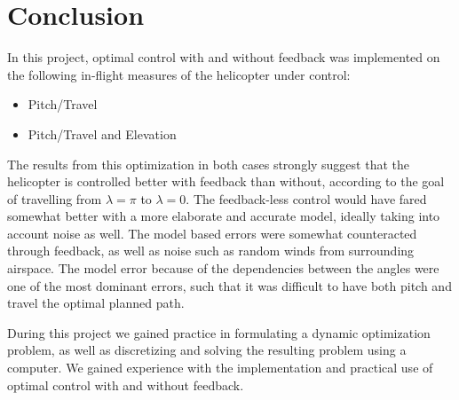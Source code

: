 \section{Conclusion}\label{sec:conclusion}

In this project, optimal control with and without feedback was implemented on the following in-flight measures of the helicopter under control:
\begin{itemize}
    \item  Pitch/Travel 
    \item  Pitch/Travel and Elevation 
\end{itemize}

The results from this optimization in both cases strongly suggest that the helicopter is controlled better with feedback than without, according to the goal of travelling from $\lambda = \pi $ to $\lambda = 0$. The feedback-less control would have fared somewhat better with a more elaborate and accurate model, ideally taking into account noise as well. The model based errors were somewhat counteracted through feedback, as well as noise such as random winds from surrounding airspace.
The model error because of the dependencies between the angles were one of the most dominant errors, such that it was difficult to have both pitch and travel the optimal planned path.  

During this project we gained practice in formulating a dynamic optimization problem, as well as discretizing and solving the resulting problem using a computer. We gained experience with the implementation and practical use of optimal control with and without feedback.


